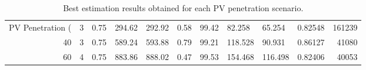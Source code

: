 \begin{table}
\caption{Best estimation results obtained for each PV penetration scenario.}
\label{tab:best_results}
\begin{tabular}{rrllllllllr}
\toprule
PV Penetration (%
\midrule
20 & 3 & 0.75 & 294.62 & 292.92 & 0.58 & 99.42 & 82.258 & 65.254 & 0.82548 & 161239 \\
40 & 3 & 0.75 & 589.24 & 593.88 & 0.79 & 99.21 & 118.528 & 90.931 & 0.86127 & 41080 \\
60 & 4 & 0.75 & 883.86 & 888.02 & 0.47 & 99.53 & 154.468 & 116.498 & 0.82406 & 40053 \\
\bottomrule
\end{tabular}
\end{table}
